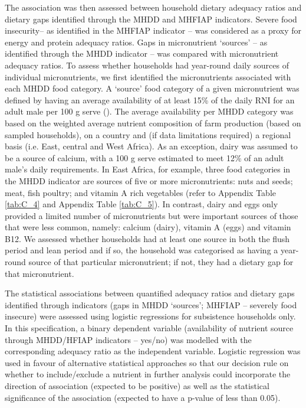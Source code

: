 The association was then assessed between household dietary adequacy ratios and dietary gaps identified through the MHDD and MHFIAP indicators. Severe food insecurity-- as identified in the MHFIAP indicator -- was considered as a proxy for energy and protein adequacy ratios. Gaps in micronutrient `sources' -- as identified through the MHDD indicator -- was compared with micronutrient adequacy ratios. To assess whether households had year-round daily sources of individual micronutrients, we first identified the micronutrients associated with each MHDD food category. A `source' food category of a given micronutrient was defined by having an average availability of at least 15\% of the daily RNI for an adult male per 100 g serve (\citealp{FAO1997}). The average availability per MHDD category was based on the weighted average nutrient composition of farm production (based on sampled households), on a country and (if data limitations required) a regional basis (i.e. East, central and West Africa). As an exception, dairy was assumed to be a source of calcium, with a 100 g serve estimated to meet 12\% of an adult male's daily requirements. In East Africa, for example, three food categories in the MHDD indicator are sources of five or more micronutrients: nuts and seeds; meat, fish poultry; and vitamin A rich vegetables (refer to Appendix Table \ref{tab:C_4} and Appendix Table \ref{tab:C_5}). In contrast, dairy and eggs only provided a limited number of micronutrients but were important sources of those that were less common, namely: calcium (dairy), vitamin A (eggs) and vitamin B12. We assessed whether households had at least one source in both the flush period and lean period and if so, the household was categorised as having a year-round source of that particular micronutrient; if not, they had a dietary gap for that micronutrient.

The statistical associations between quantified adequacy ratios and dietary gaps identified through indicators (gaps in MHDD `sources'; MHFIAP -- severely food insecure) were assessed using logistic regressions for subsistence households only. In this specification, a binary dependent variable (availability of nutrient source through MHDD/HFIAP indicators -- yes/no) was modelled with the corresponding adequacy ratio as the independent variable. Logistic regression was used in favour of alternative statistical approaches so that our decision rule on whether to include/exclude a nutrient in further analysis could incorporate the direction of association (expected to be positive) as well as the statistical significance of the association (expected to have a p-value of less than 0.05).

